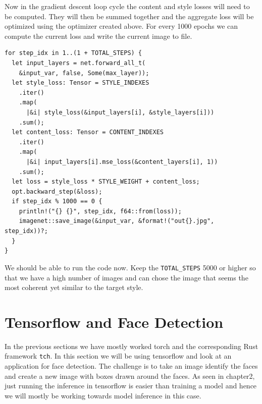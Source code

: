 \documentclass{book}
\begin{document}
Now in the gradient descent loop cycle the content and style losses will need to be computed. They will then be summed together and the aggregate loss will be optimized using the optimizer created above. For every 1000 epochs we can compute the current loss and write the current image to file.

\begin{lstlisting}[caption={}, basicstyle=\small]
for step_idx in 1..(1 + TOTAL_STEPS) {
  let input_layers = net.forward_all_t(
    &input_var, false, Some(max_layer));
  let style_loss: Tensor = STYLE_INDEXES
    .iter()
    .map(
      |&i| style_loss(&input_layers[i], &style_layers[i]))
    .sum();
  let content_loss: Tensor = CONTENT_INDEXES
    .iter()
    .map(
      |&i| input_layers[i].mse_loss(&content_layers[i], 1))
    .sum();
  let loss = style_loss * STYLE_WEIGHT + content_loss;
  opt.backward_step(&loss);
  if step_idx % 1000 == 0 {
    println!("{} {}", step_idx, f64::from(loss));
    imagenet::save_image(&input_var, &format!("out{}.jpg", step_idx))?;
  }
}
\end{lstlisting}

We should be able to run the code now. Keep the \lstinline{TOTAL_STEPS} 5000 or higher so that we have a high number of images and can chose the image that seems the most coherent yet similar to the target style.

\label{sub:neural_style_transfer}

\section{Tensorflow and Face Detection}%
In the previous sections we have mostly worked torch and the corresponding Rust framework \lstinline{tch}. In this section we will be using tensorflow and look at an application for face detection. The challenge is to take an image identify the faces and create a new image with boxes drawn around the faces. As seen in chapter2, just running the inference in tensorflow is easier than training a model and hence we will mostly be working towards model inference in this case.
\end{document}
